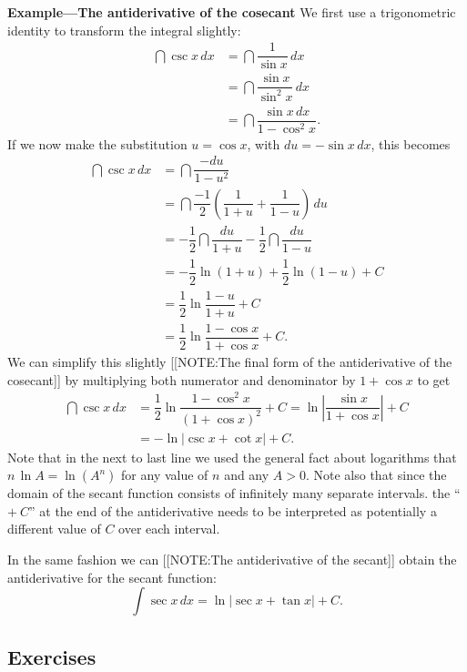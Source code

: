 {\bf Example---The antiderivative of the
  cosecant}\quad\label{trick} We
first use a trigonometric identity to transform the integral slightly:
\begin{align*}
\dint \csc{x}\,dx &= \dint \dfrac{1}{\sin{x}}\,dx \\[6pt]
  &= \dint \dfrac{\sin{x}}{\sin^2{x}}\,dx \\[6pt]
  &= \dint \dfrac{\sin{x}\,dx}{1-\cos^2{x}}.
\end{align*}
If we now make the substitution $u=\cos{x}$, with $du=-\sin{x}\,dx$,
this becomes
\begin{align*}
\dint \csc{x}\,dx &= \dint \dfrac{-du}{1-u^2} \\[3pt]
 &= \dint \dfrac{-1}{2}\left(\dfrac{1}{1+u} 
            + \dfrac{1}{1-u}\right)\,du \\[3pt]
 &= -\dfrac{1}{2}\dint  \dfrac{du}{1+u} 
            - \dfrac{1}{2}\dint \dfrac{du}{1-u} \\[3pt]
 &= -\dfrac{1}{2}\ln(1+u) + \dfrac{1}{2} \ln(1-u) +C\\[6pt]
 &= \dfrac{1}{2}\ln{\dfrac{1-u}{1+u}} +C\\[6pt]
 &= \dfrac{1}{2}\ln{\dfrac{1-\cos{x}}{1+\cos{x}}}+C.
\end{align*}
We can simplify this slightly 
[[NOTE:The final form  of the antiderivative  of the cosecant]]
by multiplying both numerator and denominator by $1+\cos{x}$ to get
\begin{align*}
\dint \csc{x}\,dx
  &= \dfrac{1}{2}\ln\dfrac{1-\cos^2{x}}{(1+\cos{x})^2}+C
   = \ln{\left|\dfrac{\sin{x}}{1+\cos{x}}\right|}+C \\
  &=-\ln{|\csc{x}+\cot{x}|}+C.\label{cosecant}
\end{align*}
Note that in the next to last line we used the general fact about
logarithms that $n\,\ln{A}=\ln(A^n)$ for any value of $n$ and any
$A>0$.  Note also that since the domain of the secant function
consists of infinitely many separate intervals. the ``$+\ C$'' at
the end of the antiderivative needs to be interpreted as potentially a
different value of $C$ over each interval.

In the same fashion we can 
[[NOTE:The antiderivative  of the secant]]
obtain the antiderivative for the secant function:\label{secant}
\[
\int \sec{x}\,dx=\ln{|\sec{x} +\tan{x}|}+C.
\]


\subsection{Exercises}
\label{subsec:exercises}

